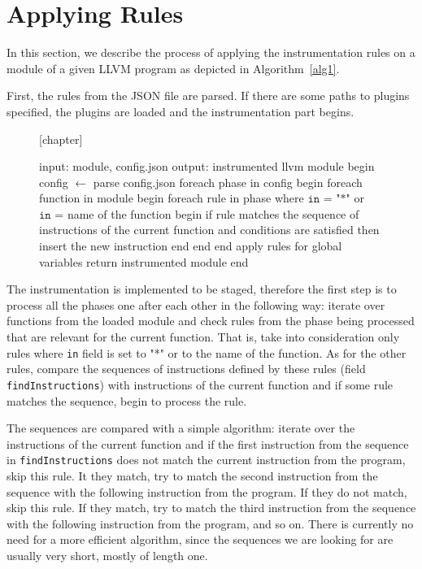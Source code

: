 \section{Applying Rules}

In this section, we describe the process of applying the instrumentation rules
on a module of a given LLVM program as depicted in
Algorithm~\ref{alg1}.


First, the rules from the JSON file are parsed. If there are some paths to
plugins specified, the plugins are loaded and the instrumentation part begins.

\begin{figure}[t]
[chapter] %

\begin{algorithm}[caption={Applying the instrumentation rules.}, label={alg1},columns=fullflexible]
 input: module, config.json
 output: instrumented llvm module
 begin
   config $\gets$ parse config.json
   foreach phase in config
   begin
      foreach function in module
      begin
         foreach rule in phase where $\texttt{in = "*"}$ or $\texttt{in =}$ name of the function
         begin
            if rule matches the sequence of instructions of the current function
               and conditions are satisfied then insert the new instruction
         end
      end
   end
   apply rules for global variables
   return instrumented module
 end
\end{algorithm}
\end{figure}

The instrumentation is implemented to be staged, therefore the first step is to
process all the phases one after each other in the following way: iterate over
functions from the loaded module and check rules from the phase being processed
that are relevant for the current function. That is, take into consideration
only rules where \texttt{in} field is set to "*" or to the name of the
function.  As for the other rules, compare the
sequences of instructions defined by these rules (field
\texttt{findInstructions}) with instructions of the current function and if
some rule matches the sequence, begin to process the rule.

The sequences are compared with a simple algorithm: iterate over the
instructions of the current function and if the first instruction from the
sequence in \texttt{findInstructions} does not match the current instruction
from the program, skip this rule. It they match, try to match the second
instruction from the sequence with the following instruction from the program.
If they do not match, skip this rule. If they match, try to match the third
instruction from the sequence with the following instruction from the program,
and so on. There is currently no need for a more efficient algorithm, since the
sequences we are looking for are usually very short, mostly of length one.


